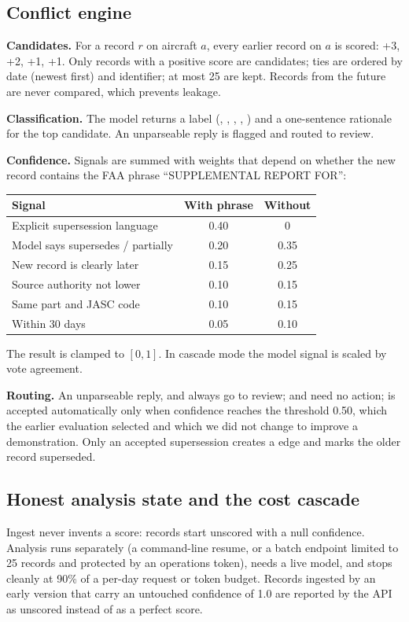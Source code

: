 \subsection{Conflict engine}
\textbf{Candidates.} For a record $r$ on aircraft $a$, every earlier record on $a$ is scored:  +3,  +2,  +1,  +1. Only records with a positive score are candidates; ties are ordered by date (newest first) and identifier; at most 25 are kept. Records from the future are never compared, which prevents leakage.

\textbf{Classification.} The model returns a label (, , , , ) and a one-sentence rationale for the top candidate. An unparseable reply is flagged and routed to review.

\textbf{Confidence.} Signals are summed with weights that depend on whether the new record contains the FAA phrase ``SUPPLEMENTAL REPORT FOR'':
\begin{center}
\begin{tabular}{lcc}
\toprule \textbf{Signal} & \textbf{With phrase} & \textbf{Without} \\ \midrule
Explicit supersession language & 0.40 & 0 \\
Model says supersedes / partially & 0.20 & 0.35 \\
New record is clearly later & 0.15 & 0.25 \\
Source authority not lower & 0.10 & 0.15 \\
Same part and JASC code & 0.10 & 0.15 \\
Within 30 days & 0.05 & 0.10 \\
\bottomrule
\end{tabular}
\end{center}
The result is clamped to $[0,1]$. In cascade mode the model signal is scaled by vote agreement.

\textbf{Routing.} An unparseable reply,  and  always go to review;  and  need no action;  is accepted automatically only when confidence reaches the threshold 0.50, which the earlier evaluation selected and which we did not change to improve a demonstration. Only an accepted supersession creates a  edge and marks the older record superseded.

\subsection{Honest analysis state and the cost cascade}
Ingest never invents a score: records start unscored with a null confidence. Analysis runs separately (a command-line resume, or a batch endpoint limited to 25 records and protected by an operations token), needs a live model, and stops cleanly at 90\% of a per-day request or token budget. Records ingested by an early version that carry an untouched confidence of 1.0 are reported by the API as unscored instead of as a perfect score.

